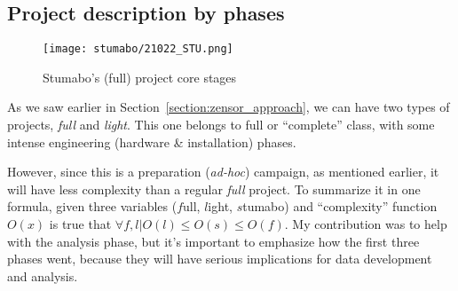 \subsection{Project description by phases}
\begin{figure}[ht]
    \texttt{[image: stumabo/21022\_STU.png]}
    \caption{Stumabo's (full) project core stages}
    \label{fig:stumabo_stages}
\end{figure}
As we saw earlier in Section~\ref{section:zensor_approach}, we can have two types of projects, \textit{full} and \textit{light}.
This one belongs to full or ``complete'' class, with some intense engineering (hardware \& installation) phases.  

However, since this is a preparation (\textit{ad-hoc}) campaign, as mentioned earlier, it will have less complexity than a regular \textit{full} project.
To summarize it in one formula, given three variables ($f$ull, $l$ight, $s$tumabo) and ``complexity'' function $O(x)$ is true that $\forall f,l| O(l) \leq O(s) \leq O(f)$.
My contribution was to help with the analysis phase, but it's important to emphasize how the first three phases went, because they will have serious implications for data development and analysis.
